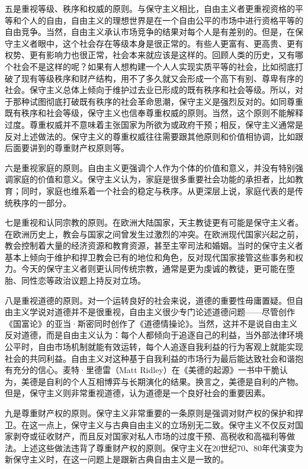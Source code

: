 五是重视等级、秩序和权威的原则。与保守主义相比，自由主义者更重视资格的平等和个人的自由，自由主义的理想世界是在一个自由公平的市场中进行资格平等的自由竞争。当然，自由主义承认市场竞争的结果对每个人是有差别的。但是，在保守主义者眼中，这个社会存在等级本身是很正常的。有些人更富有、更高贵、更有权势、更有影响力也很正常，社会本来就应该是这样的。回顾人类的历史，又有哪个社会不是这样的呢？如果有人想构建一个人人实现实质平等的社会，比如彻底打破了现有等级秩序和财产结构，用不了多久就又会形成一个高下有别、尊卑有序的社会。保守主义总体上倾向于维护过去业已形成的既有秩序和社会等级。所以，对于那种试图彻底打破既有秩序的社会革命思潮，保守主义是强烈反对的。如同尊重既有秩序和社会等级，保守主义也信奉尊重权威的原则。当然，这个原则不能解释过度。尊重权威并不意味着主张国家为所欲为或政府干预；相反，保守主义通常是反对上述做法的。保守主义的尊重权威往往需要跟其他原则和价值相协调，比如跟后面要讲到的尊重财产权原则等。

六是重视家庭的原则。自由主义更强调个人作为个体的价值和意义，并没有特别强调家庭的价值和意义。保守主义认为，家庭是很多重要社会功能的承担者，比如教育；同时，家庭也维系着一个社会的稳定与秩序。从更深层上说，家庭代表的是传统秩序的一部分。

七是重视和认同宗教的原则。在欧洲大陆国家，天主教徒更有可能是保守主义者。在欧洲历史上，教会与国家之间曾发生过激烈的冲突。在欧洲现代国家兴起之前，教会控制着大量的经济资源和教育资源，甚至主宰司法和婚姻。当时的保守主义者基本上倾向于维护和捍卫教会已有的地位和角色，反对现代国家接管这些事务和权力。今天的保守主义者则更认同传统宗教，通常是更为虔诚的教徒，更可能在堕胎、同性恋等政治议题上持反对立场。

八是重视道德的原则。对一个运转良好的社会来说，道德的重要性毋庸置疑。但自由主义学说对道德并不是很重视，自由主义很少专门论述道德问题——尽管创作《国富论》的亚当·斯密同时创作了《道德情操论》。当然，这并不是说自由主义反对道德，而是自由主义认为：每个人都倾向于追逐自己的利益，当外部法律环境公平时，自由市场机制就能有效运转，每个人追逐自我利益的行为客观上就能实现社会的共同利益。自由主义对这种基于自我利益的市场行为最后能达致社会和谐抱有充分的信心。麦特·里德雷（Matt Ridley）在《美德的起源》一书中干脆认为，美德是自利的个人互相博弈与长期演化的结果。换言之，美德是自利的产物。但是，保守主义则非常重视道德，认为道德是一个良好社会的重要因素。

九是尊重财产权的原则。保守主义非常重要的一条原则是强调对财产权的保护和捍卫。在这一点上，保守主义与古典自由主义的立场别无二致。保守主义不仅反对国家剥夺或征收财产，而且反对国家对私人市场的过度干预、高税收和高福利等做法。上述这些做法违背了尊重财产权的原则。保守主义在20世纪70、80年代演变为新保守主义时，在这一问题上是跟新古典自由主义是一致的。

